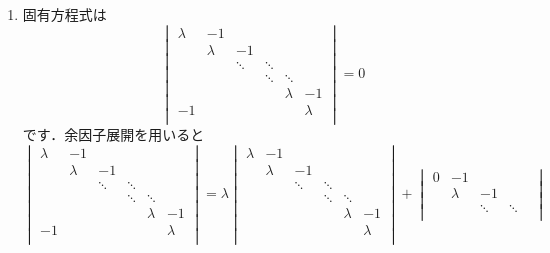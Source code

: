 \documentclass[a4paper,pdflatex,ja=standard]{bxjsarticle}
\begin{document}
\begin{enumerate}
\begin{enumerate}
    \item 

    固有方程式は
    \begin{equation}
      \begin{vmatrix}
        \lambda & -1 &   &   &   &     \\
          & \lambda & -1 &   &   &     \\
          &   & \ddots &  \ddots  &  &     \\
          &   &        &  \ddots  & \ddots &    \\
          &   &        &          & \lambda & -1  \\        
        -1 &   &        &          &       & \lambda \\
      \end{vmatrix}
      =
      0
    \end{equation}
    です．余因子展開を用いると
    \begin{equation}
      \begin{vmatrix}
        \lambda & -1 &   &   &   &     \\
          & \lambda & -1 &   &   &     \\
          &   & \ddots &  \ddots  &  &     \\
          &   &        &  \ddots  & \ddots &    \\
          &   &        &          & \lambda & -1  \\        
        -1 &   &        &          &       & \lambda \\
      \end{vmatrix}
      =
      \lambda
      \begin{vmatrix}
        \lambda & -1 &   &   &   &     \\
          & \lambda & -1 &   &   &     \\
          &   & \ddots &  \ddots  &  &     \\
          &   &        &  \ddots  & \ddots &    \\
          &   &        &          & \lambda & -1  \\        
          &   &        &          &       & \lambda \\
      \end{vmatrix}    
      +
      \begin{vmatrix}
        0 & -1 &   &   &      \\
          & \lambda & -1 &   &        \\
          &   & \ddots &  \ddots  &       \\

\end{vmatrix}
\end{equation}
\end{enumerate}
\end{enumerate}
\end{document}
